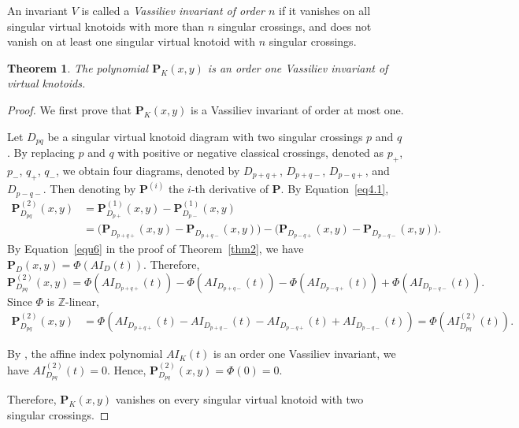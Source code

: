 \documentclass[12pt]{amsart}
\theoremstyle{noparens}
\newtheorem{theorem}{Theorem}[section]
\numberwithin{equation}{section}
\numberwithin{equation}{section}
\begin{document}
An invariant $V$ is called a \textit{Vassiliev invariant of order $n$} if it vanishes on all singular virtual knotoids with more than $n$ singular crossings, and does not vanish on at least one singular virtual knotoid with $n$ singular crossings.

\begin{theorem} \label{thm3}
	The polynomial $\mathbf P_K(x,y)$ is an order one Vassiliev invariant of virtual knotoids.
\end{theorem}


\begin{proof}
	We first prove that $\mathbf P_K(x,y)$ is a Vassiliev invariant of order at most one.
	
	Let $D_{pq}$ be a singular virtual knotoid diagram with two singular crossings $p$ and $q$.
	By replacing $p$ and $q$ with positive or negative classical crossings, denoted as $p_+$, $p_-$, $q_+$, $q_-$, we obtain four diagrams, denoted by $D_{p+q+}$, $D_{p+q-}$, $D_{p-q+}$, and $D_{p-q-}$. Then denoting by $\mathbf{P}^{(i)}$ the $i$-th derivative of $\mathbf{P}$.
	By Equation~\eqref{eq4.1}, 
	$$
	\begin{aligned}
		\mathbf P^{(2)}_{D_{pq}}(x,y)
		&=
		\mathbf P^{(1)}_{D_{p+}}(x,y)
		-
		\mathbf P^{(1)}_{D_{p-}}(x,y) \\
		&=
		\bigl(
		\mathbf P_{D_{p+q+}}(x,y)
		-
		\mathbf P_{D_{p+q-}}(x,y)
		\bigr)
		-
		\bigl(
		\mathbf P_{D_{p-q+}}(x,y)
		-
		\mathbf P_{D_{p-q-}}(x,y)
		\bigr).
	\end{aligned}
	$$		
	By Equation~\eqref{equ6} in the proof of Theorem~\ref{thm2}, we have
	$
	\mathbf P_D(x,y)=\Phi(AI_D(t))
	$. Therefore,
	$$
	\mathbf P^{(2)}_{D_{pq}}(x,y)
	=
	\Phi\left(AI_{D_{p+q+}}(t)\right)
	-
	\Phi\left(AI_{D_{p+q-}}(t)\right) 
	-
	\Phi\left(AI_{D_{p-q+}}(t)\right)
	+
	\Phi\left(AI_{D_{p-q-}}(t)\right).
	$$	
	Since $\Phi$ is $\mathbb Z$-linear,
	\[
	\begin{aligned}
		\mathbf P^{(2)}_{D_{pq}}(x,y)
		&=
		\Phi\left(
		AI_{D_{p+q+}}(t)
		-
		AI_{D_{p+q-}}(t)  
		-
		AI_{D_{p-q+}}(t)
		+
		AI_{D_{p-q-}}(t)
		\right) 
		=
		\Phi\left(
		AI^{(2)}_{D_{pq}}(t)
		\right).
	\end{aligned}
	\]		
	
	By \cite[Proposition~7.3]{MLK}, the affine index polynomial $AI_K(t)$ is an order one Vassiliev invariant, we have $AI^{(2)}_{D_{pq}}(t)=0$. Hence,	
	$\mathbf P^{(2)}_{D_{pq}}(x,y)=\Phi(0)=0.$
	
	Therefore, $\mathbf P_K(x,y)$ vanishes on every singular virtual knotoid with two singular crossings.
	

\end{proof}
\end{document}
